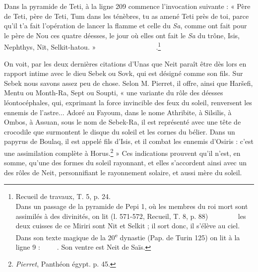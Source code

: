 \documentclass[a4paper, 11pt, oneside]{article}
\newcommand*\hieroAAAD{}
\newcommand*\hieroAAAG{}
\newcommand*\hieroAAAH{}
\newcommand*\hieroAAAO{}
\newcommand*\hieroAAAQ{}
\newcommand*\hieroAAAW{\raisebox{0.5ex}{}}
\newcommand*\hieroAABR{}
\newcommand*\hieroAACB{\raisebox{0.5ex}{}}
\newcommand*\hieroAACI{}
\newcommand*\hieroAACM{}
\newcommand*\hieroAACN{\raisebox{1ex}{}}
\newcommand*\hieroAACS{}
\newcommand*\hieroAAEK{}
\newcommand*\hieroAAEX{}
\newcommand*\hieroAAEZ{}
\newcommand*\hieroAAFN{\raisebox{0.5ex}{}}
\newcommand*\hieroAAFS{}
\newcommand*\hieroAAHE{}
\newcommand*\hieroAAIA{\raisebox{0.3ex}{}}
\newcommand*\hieroAAIS{}
\newcommand*\hieroAAKN{}
\newcommand*\hieroAALA{}
\newcommand*\hieroAAPC{\raisebox{0.5ex}{}}
\newcommand*\hieroAAPY{}
\newcommand*\hieroAASD{}
\newcommand*\hieroAASG{}
\newcommand*\hieroAAUA{}
\newcommand*\hieroAAUB{}
\newcommand*\hieroAAUC{}
\newcommand*\hieroAAUD{}
\newcommand*\hieroAAUE{}
\newcommand*\hieroAAUF{}
\newcommand*\hieroAAUG{}
\newcommand*\hieroAAUH{}
\newcommand*\hieroAAUI{}
\newcommand*\hieroAAUJ{}
\newcommand*\hieroAAUK{}
\newcommand*\hieroAAUL{}
\newcommand*\hieroAAUM{}
\newcommand*\hieroAAUN{}
\newcommand*\hieroAAUO{}
\newcommand*\hieroAAUP{}
\newcommand*\hieroAAUQ{}
\newcommand*\hieroAAUR{}
\newcommand*\hieroAAUS{}
\newcommand*\hieroAAUT{}
\begin{document}
Dans la pyramide de Teti, à la ligne 209 commence l'invocation suivante : « Père de Teti, père de Teti, Tum dans les ténèbres, tu as amené Teti près de toi, parce qu’il t'a fait l'opération de lancer la flamme et celle du \emph{Sa}, comme ont fait pour le père de Nou ces quatre déesses, le jour où elles ont fait le \emph{Sa} du trône, Isis, Nephthys, Nit, Selkit-hatou. » $\hieroAAIS\:\hieroAAUA\:\hieroAAAG\allowbreak\:\hieroAAUB\:\hieroAAUC\:\hieroAACM\:\hieroAAUD\:\hieroAAUE\:\hieroAAAH\allowbreak\:\hieroAAHE\:\hieroAACM\:\hieroAAIA\:\hieroAAEK\:\hieroAASG\:\hieroAALA\allowbreak\:\hieroAALA\:\hieroAALA\:\hieroAAUF\:\hieroAACM\:\hieroAAUG\:\hieroAAAG\allowbreak\:\hieroAACN\:\hieroAACS\:\hieroAACN\:\hieroAAUH\:\hieroAAUI\:\hieroAAUJ\allowbreak\:\hieroAAFS\:\hieroAAUK\:\hieroAAAQ\:\hieroAACI\:\hieroAACS\:\hieroAAUL\allowbreak\:\hieroAAEZ\:\hieroAACB\:\hieroAACM\allowbreak\:\hieroAAUM\:\hieroAACI$.\footnote{Recueil de travaux, T. 5, p. 24.\\\hspace*{5mm}Dans un passage de la pyramide de Pepi 1, où les membres du roi mort sont assimilés à des divinités, on lit (l. 571-572, Recueil, T. 8, p. 88) $\hieroAAUN\:\hieroAAPY\:\hieroAAPY\allowbreak\:\hieroAAUO\:\hieroAABR\:\hieroAAAQ\:\hieroAAAO\:\hieroAAEZ\:\hieroAAKN\allowbreak\:\hieroAAUP\:\hieroAAUQ\:\hieroAAAH\:\hieroAAAH\:\hieroAAUR\:\hieroAAAH\allowbreak\:\hieroAAUS\:\hieroAAPC$ les deux cuisses de ce Miriri sont Nit et Selkit ; il sort donc, il s'élève au ciel.\\\hspace*{5mm}Dans son texte magique de la 20\textsuperscript{e} dynastie (Pap. de Turin 125) on lit à la ligne 9 : $\hieroAAUT\:\hieroAAFN\:\hieroAASD\allowbreak\:\hieroAAEX\:\hieroAALA\:\hieroAAAD\allowbreak\:\hieroAAAG\:\hieroAAAH\allowbreak\:\hieroAAAH\:\hieroAAAW$. Son ventre est Neit de Saïs.}

On voit, par les deux dernières citations d'Unas que Neit paraît être dès lors en rapport intime avec le dieu Sebek ou Sovk, qui est désigné comme son fils. Sur Sebek nous savons assez peu de chose. Selon M. Pierret, il offre, ainsi que Haršefi, Mentu ou Month-Ra, Sept ou Soupti, « une variante du rôle des déesses léontocéphales, qui, exprimant la force invincible des feux du soleil, renversent les ennemis de l'astre... Adoré au Fayoum, dans le nome Athribite, à Silsilis, à Ombos, à Assuan, sous le nom de Sebek-Ra, il est représenté avec une tête de crocodile que surmontent le disque du soleil et les cornes du bélier. Dans un papyrus de Boulaq, il est appelé fils d'Isis, et il combat les ennemis d'Osiris : c'est une assimilation complète à Horus.\footnote{\emph{Pierret}, Panthéon égypt. p. 45.} » Ces indications prouvent qu'il n'est, en somme, qu'une des formes du soleil rayonnant, et elles s'accordent ainsi avec un des rôles de Neit, personnifiant le rayonnement solaire, et aussi mère du soleil.
\end{document}
